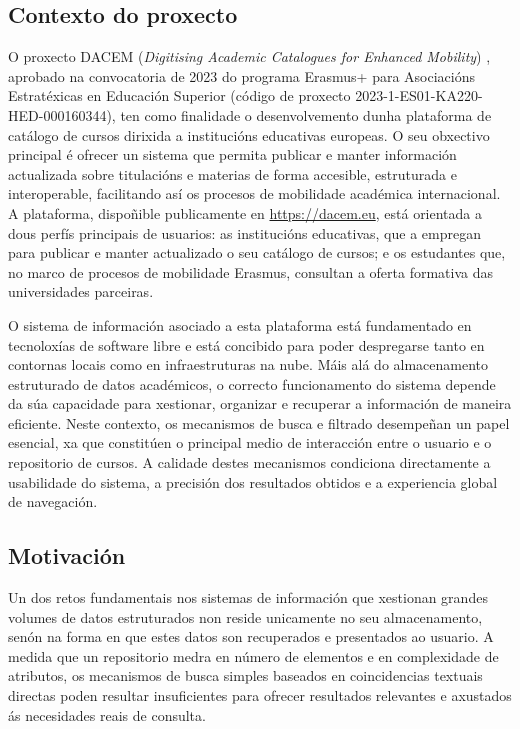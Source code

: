 \documentclass[%
    a4paper,               %
    twoside,               %
    10pt,                  %
]{article}                 %
\begin{document}
\subsection{Contexto do proxecto}
O proxecto DACEM (\textit{Digitising Academic Catalogues for Enhanced Mobility}) \cite{dacem}, aprobado na convocatoria de 2023 do programa Erasmus+ para Asociacións Estratéxicas en Educación Superior (código de proxecto 2023-1-ES01-KA220-HED-000160344), ten como finalidade o desenvolvemento dunha plataforma de catálogo de cursos dirixida a institucións educativas europeas. O seu obxectivo principal é ofrecer un sistema que permita publicar e manter información actualizada sobre titulacións e materias de forma accesible, estruturada e interoperable, facilitando así os procesos de mobilidade académica internacional. A plataforma, dispoñible publicamente en \url{https://dacem.eu}, está orientada a dous perfís principais de usuarios: as institucións educativas, que a empregan para publicar e manter actualizado o seu catálogo de cursos; e os estudantes que, no marco de procesos de mobilidade Erasmus, consultan a oferta formativa das universidades parceiras.

O sistema de información asociado a esta plataforma está fundamentado en tecnoloxías de software libre e está concibido para poder despregarse tanto en contornas locais como en infraestruturas na nube. Máis alá do almacenamento estruturado de datos académicos, o correcto funcionamento do sistema depende da súa capacidade para xestionar, organizar e recuperar a información de maneira eficiente. Neste contexto, os mecanismos de busca e filtrado desempeñan un papel esencial, xa que constitúen o principal medio de interacción entre o usuario e o repositorio de cursos. A calidade destes mecanismos condiciona directamente a usabilidade do sistema, a precisión dos resultados obtidos e a experiencia global de navegación.

\subsection{Motivación}
Un dos retos fundamentais nos sistemas de información que xestionan grandes volumes de datos estruturados non reside unicamente no seu almacenamento, senón na forma en que estes datos son recuperados e presentados ao usuario. A medida que un repositorio medra en número de elementos e en complexidade de atributos, os mecanismos de busca simples baseados en coincidencias textuais directas poden resultar insuficientes para ofrecer resultados relevantes e axustados ás necesidades reais de consulta.
\end{document}
